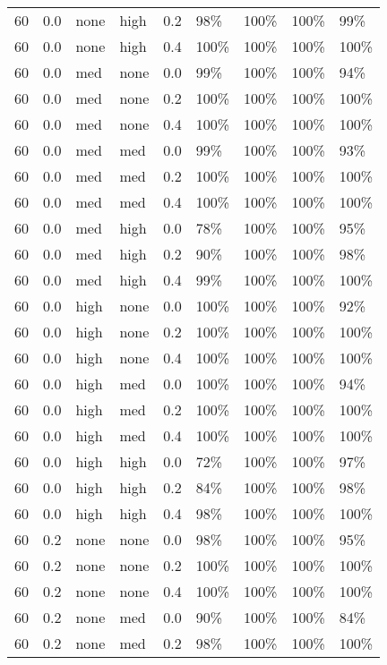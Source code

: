 \begin{longtable}{rrllrllll}
  60 & 0.0 & none & high & 0.2 & 98\% & 100\% & 100\% & 99\% \\ 
  60 & 0.0 & none & high & 0.4 & 100\% & 100\% & 100\% & 100\% \\ 
  60 & 0.0 & med & none & 0.0 & 99\% & 100\% & 100\% & 94\% \\ 
  60 & 0.0 & med & none & 0.2 & 100\% & 100\% & 100\% & 100\% \\ 
  60 & 0.0 & med & none & 0.4 & 100\% & 100\% & 100\% & 100\% \\ 
  60 & 0.0 & med & med & 0.0 & 99\% & 100\% & 100\% & 93\% \\ 
  60 & 0.0 & med & med & 0.2 & 100\% & 100\% & 100\% & 100\% \\ 
  60 & 0.0 & med & med & 0.4 & 100\% & 100\% & 100\% & 100\% \\ 
  60 & 0.0 & med & high & 0.0 & 78\% & 100\% & 100\% & 95\% \\ 
  60 & 0.0 & med & high & 0.2 & 90\% & 100\% & 100\% & 98\% \\ 
  60 & 0.0 & med & high & 0.4 & 99\% & 100\% & 100\% & 100\% \\ 
  60 & 0.0 & high & none & 0.0 & 100\% & 100\% & 100\% & 92\% \\ 
  60 & 0.0 & high & none & 0.2 & 100\% & 100\% & 100\% & 100\% \\ 
  60 & 0.0 & high & none & 0.4 & 100\% & 100\% & 100\% & 100\% \\ 
  60 & 0.0 & high & med & 0.0 & 100\% & 100\% & 100\% & 94\% \\ 
  60 & 0.0 & high & med & 0.2 & 100\% & 100\% & 100\% & 100\% \\ 
  60 & 0.0 & high & med & 0.4 & 100\% & 100\% & 100\% & 100\% \\ 
  60 & 0.0 & high & high & 0.0 & 72\% & 100\% & 100\% & 97\% \\ 
  60 & 0.0 & high & high & 0.2 & 84\% & 100\% & 100\% & 98\% \\ 
  60 & 0.0 & high & high & 0.4 & 98\% & 100\% & 100\% & 100\% \\ 
  60 & 0.2 & none & none & 0.0 & 98\% & 100\% & 100\% & 95\% \\ 
  60 & 0.2 & none & none & 0.2 & 100\% & 100\% & 100\% & 100\% \\ 
  60 & 0.2 & none & none & 0.4 & 100\% & 100\% & 100\% & 100\% \\ 
  60 & 0.2 & none & med & 0.0 & 90\% & 100\% & 100\% & 84\% \\ 
  60 & 0.2 & none & med & 0.2 & 98\% & 100\% & 100\% & 100\% \\ 

\end{longtable}
